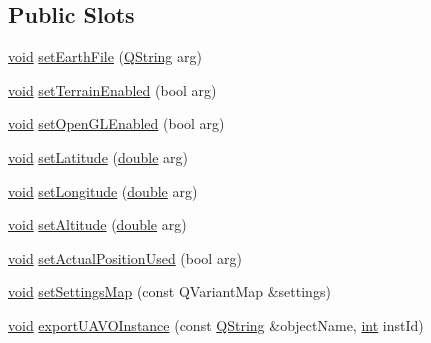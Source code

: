 \subsection*{Public Slots}
\begin{DoxyCompactItemize}
\item 
\hyperlink{group___u_a_v_objects_plugin_ga444cf2ff3f0ecbe028adce838d373f5c}{void} \hyperlink{class_pfd_qml_gadget_widget_af23ee4cc6d639d2a019f4e8fe4e15060}{set\-Earth\-File} (\hyperlink{group___u_a_v_objects_plugin_gab9d252f49c333c94a72f97ce3105a32d}{Q\-String} arg)
\item 
\hyperlink{group___u_a_v_objects_plugin_ga444cf2ff3f0ecbe028adce838d373f5c}{void} \hyperlink{class_pfd_qml_gadget_widget_a7aa0403e143a8d67f4088fd2594bd096}{set\-Terrain\-Enabled} (bool arg)
\item 
\hyperlink{group___u_a_v_objects_plugin_ga444cf2ff3f0ecbe028adce838d373f5c}{void} \hyperlink{class_pfd_qml_gadget_widget_a7938e1ce661bc7530c6b3f595ef557a1}{set\-Open\-G\-L\-Enabled} (bool arg)
\item 
\hyperlink{group___u_a_v_objects_plugin_ga444cf2ff3f0ecbe028adce838d373f5c}{void} \hyperlink{class_pfd_qml_gadget_widget_a331378be36a826e7f1b9678c46661a11}{set\-Latitude} (\hyperlink{_super_l_u_support_8h_a8956b2b9f49bf918deed98379d159ca7}{double} arg)
\item 
\hyperlink{group___u_a_v_objects_plugin_ga444cf2ff3f0ecbe028adce838d373f5c}{void} \hyperlink{class_pfd_qml_gadget_widget_ab4bf552f6d0785db30a5c298c5367f34}{set\-Longitude} (\hyperlink{_super_l_u_support_8h_a8956b2b9f49bf918deed98379d159ca7}{double} arg)
\item 
\hyperlink{group___u_a_v_objects_plugin_ga444cf2ff3f0ecbe028adce838d373f5c}{void} \hyperlink{class_pfd_qml_gadget_widget_a0dba26ac750789dc0f7a28e0ddbfe45c}{set\-Altitude} (\hyperlink{_super_l_u_support_8h_a8956b2b9f49bf918deed98379d159ca7}{double} arg)
\item 
\hyperlink{group___u_a_v_objects_plugin_ga444cf2ff3f0ecbe028adce838d373f5c}{void} \hyperlink{class_pfd_qml_gadget_widget_ae9376fbd87bd39f047287671efac9050}{set\-Actual\-Position\-Used} (bool arg)
\item 
\hyperlink{group___u_a_v_objects_plugin_ga444cf2ff3f0ecbe028adce838d373f5c}{void} \hyperlink{class_pfd_qml_gadget_widget_a09b5734522527945771e50e69b23ae70}{set\-Settings\-Map} (const Q\-Variant\-Map \&settings)
\item 
\hyperlink{group___u_a_v_objects_plugin_ga444cf2ff3f0ecbe028adce838d373f5c}{void} \hyperlink{class_pfd_qml_gadget_widget_acbeba4ca943c899325dde1e5390163c7}{export\-U\-A\-V\-O\-Instance} (const \hyperlink{group___u_a_v_objects_plugin_gab9d252f49c333c94a72f97ce3105a32d}{Q\-String} \&object\-Name, \hyperlink{ioapi_8h_a787fa3cf048117ba7123753c1e74fcd6}{int} inst\-Id)
\end{DoxyCompactItemize}
